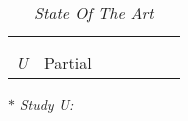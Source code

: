 \begin{table}[!htb]
	\centering
	\caption[State Of The Art]
	{\textit{State Of The Art}}
	\label{tbl:ch4_stateOfTheArt}
	\begin{threeparttable}
		\begin{tabularx}{\textwidth}{cYYYYYY}
			\toprule
			 &  &  &  \\ 
			 \cmidrule(lr){2-4} \cmidrule(lr){5-6} \cmidrule(lr){7-7}
			 & \RaggedRight {} & \RaggedRight {} & \RaggedRight {} &  &  & \RaggedRight {} \\ 		
			\midrule
				\sotaCore
				\textit{U}\tnote{$\ast$} & Partial & \cmark & \cmark & \cmark & \cmark & \cmark \\
			\bottomrule
		\end{tabularx}
		\begin{tablenotes}\footnotesize
			\item[$\ast$] \textit{Study U:~\ThesisTitle}
		\end{tablenotes}
	\end{threeparttable}
\end{table}

